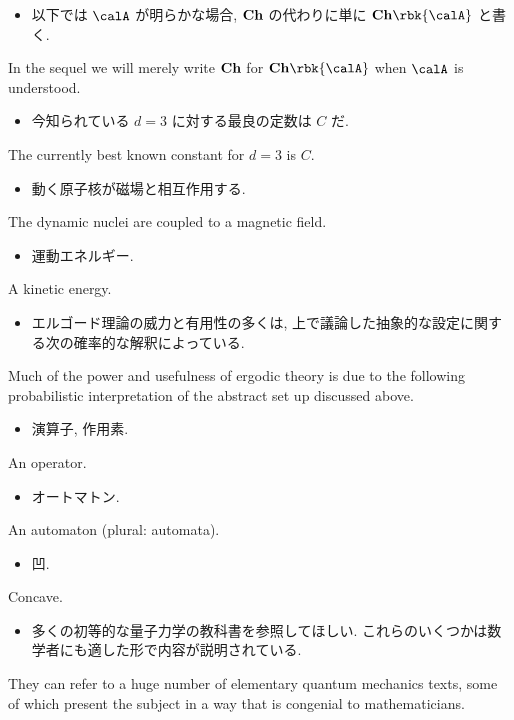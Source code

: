 \documentclass[openany, a4paper, oneside]{jsbook}
\begin{document}
\begin{itemize}
\item 以下では $\calA$ が明らかな場合, $\bf{Ch}$ の代わりに単に $\bf{Ch} \rbk{\calA}$ と書く. \cite{CharlesWeibel1}
\end{itemize}
In the sequel we will merely write $\bf{Ch}$ for $\bf{Ch} \rbk{\calA}$ when $\calA$ is understood.

\begin{itemize}
\item 今知られている $d=3$ に対する最良の定数は $C$ だ. \cite{LiebSeiringer1}
\end{itemize}
The currently best known constant for $d=3$ is $C$.

\begin{itemize}
\item 動く原子核が磁場と相互作用する. \cite{LiebSeiringer1}
\end{itemize}
The dynamic nuclei are coupled to a magnetic field.

\begin{itemize}
\item 運動エネルギー.
\end{itemize}
A kinetic energy.

\begin{itemize}
\item エルゴード理論の威力と有用性の多くは, 上で議論した抽象的な設定に関する次の確率的な解釈によっている. \cite{OmriSarig1}
\end{itemize}
Much of the power and usefulness of ergodic theory is due to
the following probabilistic interpretation of the abstract set up discussed above.

\begin{itemize}
\item 演算子, 作用素.
\end{itemize}
An operator.

\begin{itemize}
\item オートマトン.
\end{itemize}
An automaton (plural: automata).

\begin{itemize}
\item 凹.
\end{itemize}
Concave.

\begin{itemize}
\item 多くの初等的な量子力学の教科書を参照してほしい. これらのいくつかは数学者にも適した形で内容が説明されている. \cite{LiebSeiringer1}
\end{itemize}
They can refer to a huge number of elementary quantum mechanics texts,
some of which present the subject in a way that is congenial to mathematicians.
\end{document}
